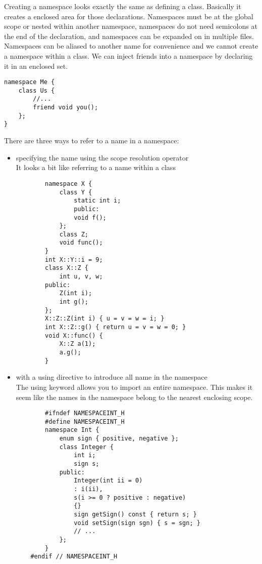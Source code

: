 \documentclass[12pt]{article}
\begin{document}
Creating a namespace looks exactly the same as defining a class. Basically it creates a enclosed area for those declarations. Namespaces must be at the global scope or nested within another namespace, namespaces do not need semicolons at the end of the declaration, and namespaces can be expanded on in multiple files. Namespaces can be aliased to another name for convenience and we cannot create a namespace within a class. We can inject friends into a namespace by declaring it in an enclosed set.
\begin{lstlisting}
namespace Me {
    class Us {
        //...
        friend void you();
    };
}
\end{lstlisting}

There are three ways to refer to a name in a namespace:
\begin{itemize}
    \item specifying the name using the scope resolution operator\\
    It looks a bit like referring to a name within a class
    \begin{lstlisting}
        namespace X {
            class Y {
                static int i;
                public:
                void f();
            };
            class Z;
            void func();
        }
        int X::Y::i = 9;
        class X::Z {
            int u, v, w;
        public:
            Z(int i);
            int g();
        };
        X::Z::Z(int i) { u = v = w = i; }
        int X::Z::g() { return u = v = w = 0; }
        void X::func() {
            X::Z a(1);
            a.g();
        }
    \end{lstlisting}
    \item with a using directive to introduce all name in the namespace\\
    The using keyword allows you to import an entire namespace. This makes it seem like the names in the namespace belong to the nearest enclosing scope.
    \begin{lstlisting}
        #ifndef NAMESPACEINT_H
        #define NAMESPACEINT_H
        namespace Int {
            enum sign { positive, negative };
            class Integer {
                int i;
                sign s;
            public:
                Integer(int ii = 0)
                : i(ii),
                s(i >= 0 ? positive : negative)
                {}
                sign getSign() const { return s; }
                void setSign(sign sgn) { s = sgn; }
                // ...
            };
        }
    #endif // NAMESPACEINT_H


\end{lstlisting}
\end{itemize}
\end{document}
